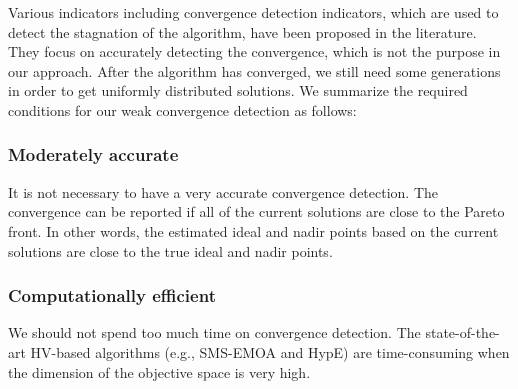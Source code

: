 \documentclass[conference]{IEEEtran}
\begin{document}
%
%
%
Various indicators including convergence detection indicators, which are used to detect the stagnation of the algorithm, 
have been proposed in the literature\cite{convergenceDetection:1, convergenceDetection:LSSC, 
convergenceDetection:OCD, convergenceDetection:OFCDandOCD, convergenceDetection:convergenceMetric, 
convergenceDetection:maxCD, convergenceDetection:online}. 
They focus on accurately detecting the convergence, which is not the purpose in our approach.
After the algorithm has converged, we still need some generations in order to
get uniformly distributed solutions. 
We summarize the required conditions for our weak convergence detection as follows:
\subsubsection{Moderately accurate} It is not necessary to have a very accurate convergence detection. 
The convergence can be reported if all of the current solutions are close to the Pareto front.
In other words, the estimated ideal and nadir points based on the current solutions
are close to the true ideal and nadir points. 
\subsubsection{Computationally efficient} We should not spend too much time on convergence detection. 
The state-of-the-art HV-based algorithms (e.g., SMS-EMOA and HypE) 
are time-consuming when the dimension of the objective space is very high. 
\end{document}
